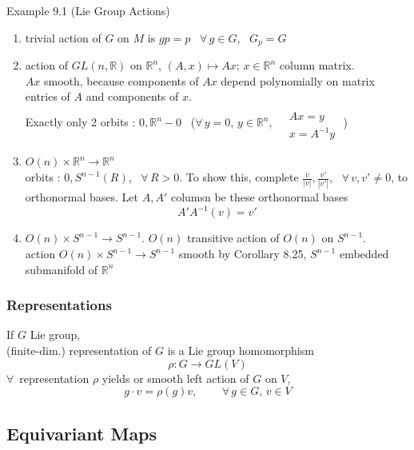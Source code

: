 Example 9.1 (Lie Group Actions)
\begin{enumerate}
\item[(a)] trivial action of $G$ on $M$ is $gp = p$ \, $\forall \, g \in G$, \, $G_p = G$
\item[(b)] action of $GL(n,\mathbb{R}) $ on $\mathbb{R}^n$, $(A,x) \mapsto Ax$; $x \in \mathbb{R}^n$ column matrix.  \\
$Ax $ smooth, because components of $Ax$ depend polynomially on matrix entries of $A$ and components of $x$.  \\
Exactly only 2 orbits : $0, \mathbb{R}^n - 0$ \, ($\forall \, y =0$, $y\in \mathbb{R}^n$, $\begin{aligned} & \quad \\ 
  & Ax  =y \\ 
  & x = A^{-1}y \end{aligned}$ ) 
\item[(c)] $O(n) \times \mathbb{R}^n \to \mathbb{R}^n$  \\
orbits : $0, S^{n-1}(R)$, \, $\forall \, R >0$.  To show this, complete $\frac{v}{ |v|}, \frac{v'}{|v'|}$, \, $\forall \, v , v' \neq 0$, to orthonormal bases.  Let $A, A'$ columsn be these orthonormal bases 
\[
A' A^{-1}(v) = v'
\]
\item[(d)] $O(n) \times S^{n-1} \to S^{n-1}$.  $O(n)$ transitive action of $O(n)$ on $S^{n-1}$.  \\
action $O(n) \times S^{n-1} \to S^{n-1}$ smooth by Corollary 8.25, $S^{n-1}$ embedded submanifold of $\mathbb{R}^n$

\end{enumerate}





\subsubsection*{Representations}

If $G$ Lie group, \\
(finite-dim.) representation of $G$ is a Lie group homomorphism 
\[
\rho : G \to GL(V)
\]
$\forall \, $ representation $\rho$ yields or smooth left action of $G$ on $V$, 
\[
g\cdot v = \rho(g) v , \quad \quad \, \forall \, g \in G, \, v \in V
\]


\subsection*{Equivariant Maps }

